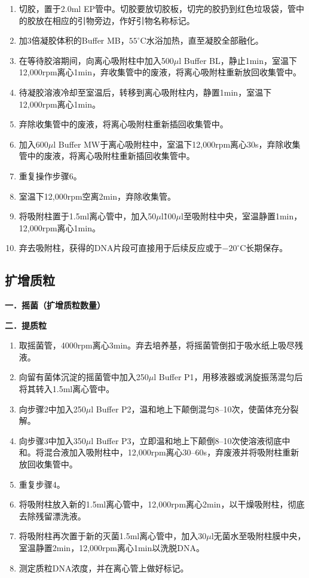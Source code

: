 \begin{enumerate}[itemsep=0.1em]
  \item 切胶，置于2.0ml EP管中。切胶要放切胶板，切完的胶扔到红色垃圾袋，管中的胶放在相应的引物旁边，作好引物名称标记。
  \item 加3倍凝胶体积的Buffer MB，$55^\circ\text{C}$水浴加热，直至凝胶全部融化。
  \item 在等待胶溶期间，向离心吸附柱中加入500$\mu$l Buffer BL，静止1min，室温下12,000rpm离心1min，弃收集管中的废液，将离心吸附柱重新放回收集管中。
  \item 待凝胶溶液冷却至室温后，转移到离心吸附柱内，静置1min，室温下12,000rpm离心1min。
  \item 弃除收集管中的废液，将离心吸附柱重新插回收集管中。
  \item 加入600$\mu$l Buffer MW于离心吸附柱中，室温下12,000rpm离心30s，弃除收集管中的废液，将离心吸附柱重新插回收集管中。
  \item 重复操作步骤6。
  \item 室温下12,000rpm空离2min，弃除收集管。
  \item 将吸附柱置于1.5ml离心管中，加入50$\mu$l\~100$\mu$l至吸附柱中央，室温静置1min，12,000rpm离心1min。
  \item 弃去吸附柱，获得的DNA片段可直接用于后续反应或于$-20^\circ\text{C}$长期保存。
\end{enumerate}

\subsection{扩增质粒}

\textbf{一．摇菌（扩增质粒数量）}

\textbf{二．提质粒}

\begin{enumerate}[itemsep=0.3em]
  \item 取摇菌管，4000rpm离心3min。弃去培养基，将摇菌管倒扣于吸水纸上吸尽残液。
  \item 向留有菌体沉淀的摇菌管中加入250$\mu$l Buffer P1，用移液器或涡旋振荡混匀后将其转入1.5ml离心管中。
  \item 向步骤2中加入250$\mu$l Buffer P2，温和地上下颠倒混匀8–10次，使菌体充分裂解。
  \item 向步骤3中加入350$\mu$l Buffer P3，立即温和地上下颠倒8–10次使溶液彻底中和。将混合液加入吸附柱中，12,000rpm离心30–60s，弃废液并将吸附柱重新放回收集管中。
  \item 重复步骤4。
  \item 将吸附柱放入新的1.5ml离心管中，12,000rpm离心2min，以干燥吸附柱，彻底去除残留漂洗液。
  \item 将吸附柱再次置于新的灭菌1.5ml离心管中，加入30$\mu$l无菌水至吸附柱膜中央，室温静置2min，12,000rpm离心1min以洗脱DNA。
  \item 测定质粒DNA浓度，并在离心管上做好标记。
\end{enumerate}

